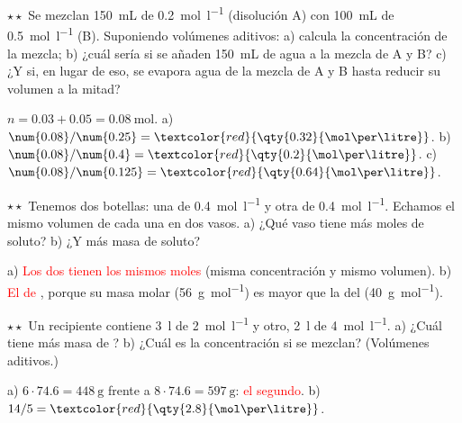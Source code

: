 \begin{exercise}
    \(\star\star\) Se mezclan \qty{150}{\mL} de  \qty{0.2}{\mol\per\litre} (disolución A) con \qty{100}{\mL} de 
    \qty{0.5}{\mol\per\litre} (B). Suponiendo volúmenes aditivos: a) calcula la concentración de la mezcla; b) ¿cuál sería si se
    añaden \qty{150}{\mL} de agua a la mezcla de A y B? c) ¿Y si, en lugar de eso, se evapora agua de la mezcla de A y B hasta
    reducir su volumen a la mitad?
    \begin{solu}
        \(n = \num{0.03} + \num{0.05} = \qty{0.08}{\mol}\). a) \(\num{0.08}/\num{0.25} = \textcolor{red}{\qty{0.32}{\mol\per\litre}}\).
        b) \(\num{0.08}/\num{0.4} = \textcolor{red}{\qty{0.2}{\mol\per\litre}}\). c) \(\num{0.08}/\num{0.125} = \textcolor{red}{\qty{0.64}{\mol\per\litre}}\).
    \end{solu}
\end{exercise}

\begin{exercise}
    \(\star\star\) Tenemos dos botellas: una de  \qty{0.4}{\mol\per\litre} y otra de  \qty{0.4}{\mol\per\litre}.
    Echamos el mismo volumen de cada una en dos vasos. a) ¿Qué vaso tiene más moles de soluto? b) ¿Y más masa de soluto?
    \begin{solu}
        a) \textcolor{red}{Los dos tienen los mismos moles} (misma concentración y mismo volumen). b) \textcolor{red}{El de },
        porque su masa molar (\qty{56}{\gram\per\mol}) es mayor que la del  (\qty{40}{\gram\per\mol}).
    \end{solu}
\end{exercise}

\begin{exercise}
    \(\star\star\) Un recipiente contiene \qty{3}{\litre} de  \qty{2}{\mol\per\litre} y otro, \qty{2}{\litre} de 
    \qty{4}{\mol\per\litre}. a) ¿Cuál tiene más masa de ? b) ¿Cuál es la concentración si se mezclan? (Volúmenes aditivos.)
    \begin{solu}
        a) \(6 \cdot \num{74.6} = \qty{448}{\gram}\) frente a \(8 \cdot \num{74.6} = \qty{597}{\gram}\): \textcolor{red}{el segundo}.
        b) \(14/5 = \textcolor{red}{\qty{2.8}{\mol\per\litre}}\).
    \end{solu}
\end{exercise}

